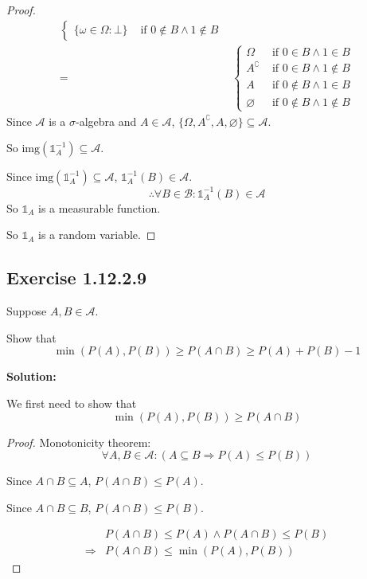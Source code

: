 \documentclass{article}
\begin{document}
\begin{proof}
\begin{align*}
\begin{cases}
    \{\omega\in\Omega:\bot\}&\text{ if }0\notin B\wedge 1\notin B
    \end{cases} \\
    =& \begin{cases}
    \Omega &\text{ if }0\in B\wedge 1\in B\\
    A^\complement&\text{ if }0\in B\wedge 1\notin B\\
    A&\text{ if }0\notin B\wedge 1\in B\\
    \varnothing&\text{ if }0\notin B\wedge 1\notin B
    \end{cases}
\end{align*}
Since \(\mathcal{A}\) is a \(\sigma\)-algebra and \(A\in \mathcal{A}\), \(\{\Omega, A^\complement, A, \varnothing\}\subseteq \mathcal{A}\).

So \(\mathrm{img}(\mathds{1}_A^{-1}) \subseteq \mathcal{A}\).

Since \(\mathrm{img}(\mathds{1}_A^{-1})\subseteq \mathcal{A}\), \(\mathds{1}_A^{-1}(B)\in \mathcal{A}\).
\[\therefore \forall B\in \mathcal{B}: \mathds{1}_A^{-1}(B)\in \mathcal{A}\]
So \(\mathds{1}_A\) is a measurable function.

So \(\mathds{1}_A\) is a random variable.
\end{proof}

\subsection{Exercise 1.12.2.9}

Suppose \(A,B \in \mathcal{A}\).

Show that
\[\min(P(A),P(B)) \geq P(A\cap B) \geq P(A)+P(B)-1\]

\textbf{Solution:}

We first need to show that
\[\min(P(A), P(B)) \geq P(A \cap B)\]

\begin{proof}
Monotonicity theorem:
\[\forall A,B\in \mathcal{A}: (A\subseteq B \Rightarrow P(A)\leq P(B))\]

Since \(A\cap B \subseteq A\), \(P(A\cap B) \leq P(A)\).

Since \(A\cap B \subseteq B\), \(P(A\cap B) \leq P(B)\).

\begin{align*}
	 & P(A\cap B)\leq P(A) \wedge P(A\cap B)\leq P(B) \\
	\Rightarrow & P(A \cap B) \leq \min(P(A), P(B))
\end{align*}
\end{proof}
\end{document}
